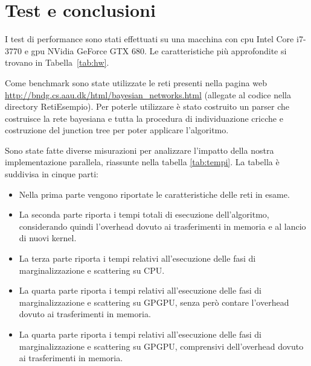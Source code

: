 \documentclass[a4paper]{article}   %
\begin{document}


\section{Test e conclusioni}
I test di performance sono stati effettuati su una macchina con cpu Intel Core i7-3770 e gpu NVidia GeForce GTX 680. Le caratteristiche più approfondite si trovano in Tabella~\ref{tab:hw}.

Come benchmark sono state utilizzate le reti presenti nella pagina web \url{http://bndg.cs.aau.dk/html/bayesian_networks.html} (allegate al codice nella directory RetiEsempio).
Per poterle utilizzare è stato costruito un parser che costruisce la rete bayesiana e tutta la procedura di individuazione cricche e costruzione del junction tree per poter applicare l'algoritmo.

Sono state fatte diverse misurazioni per analizzare l'impatto della nostra implementazione parallela, riassunte nella tabella \ref{tab:tempi}.
La tabella è suddivisa in cinque parti:
\begin{itemize}
\item Nella prima parte vengono riportate le caratteristiche delle reti in esame.
\item La seconda parte riporta i tempi totali di esecuzione dell'algoritmo, considerando quindi l'overhead dovuto ai trasferimenti in memoria e al lancio di nuovi kernel.
\item La terza parte riporta i tempi relativi all'esecuzione delle fasi di marginalizzazione e scattering su CPU.
\item La quarta parte riporta i tempi relativi all'esecuzione delle fasi di marginalizzazione e scattering su GPGPU, senza però contare l'overhead dovuto ai trasferimenti in memoria.
\item La quarta parte riporta i tempi relativi all'esecuzione delle fasi di marginalizzazione e scattering su GPGPU, comprensivi dell'overhead dovuto ai trasferimenti in memoria.
\end{itemize}
\end{document}
